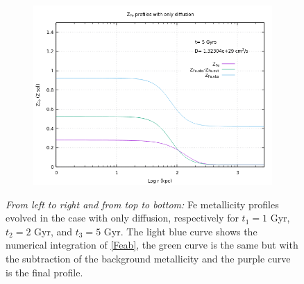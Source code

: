 \documentclass{article}
\begin{document}
\begin{figure} [H]
\begin{subfigure}{0.49\textwidth}
	\end{subfigure}
	\begin{subfigure}{0.49\textwidth}
		\includegraphics[width=0.9\linewidth]{Z_diff_5.png}
	\end{subfigure}
	\caption{\textit{From left to right and from top to bottom:} Fe metallicity profiles evolved in the case with only diffusion, respectively for $t_{1}=1 $ Gyr, $t_{2}=2$ Gyr, and $t_{3}=5$ Gyr. The light blue curve shows the numerical integration of \eqref{Feab}, the green curve is the same but with the subtraction of the background metallicity and the purple curve is the final profile.}
	\label{fig:Zdiffonly}
\end{figure}
\end{document}
